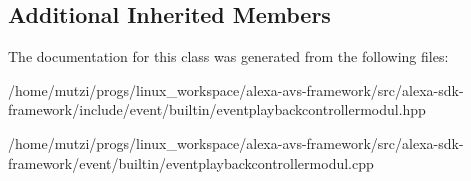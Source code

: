 \subsection*{Additional Inherited Members}


The documentation for this class was generated from the following files\+:\begin{DoxyCompactItemize}
\item 
/home/mutzi/progs/linux\+\_\+workspace/alexa-\/avs-\/framework/src/alexa-\/sdk-\/framework/include/event/builtin/eventplaybackcontrollermodul.\+hpp\item 
/home/mutzi/progs/linux\+\_\+workspace/alexa-\/avs-\/framework/src/alexa-\/sdk-\/framework/event/builtin/eventplaybackcontrollermodul.\+cpp\end{DoxyCompactItemize}
